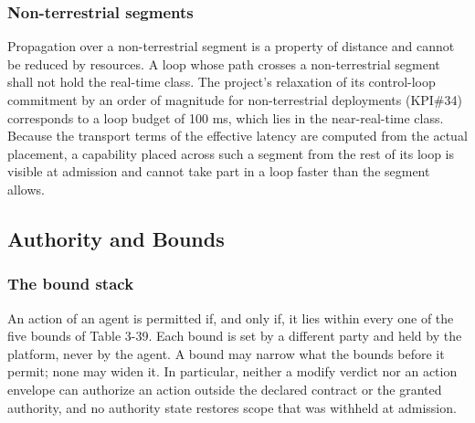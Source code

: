 \hypertarget{non-terrestrial-segments}{%
\subsubsection{Non-terrestrial segments}\label{non-terrestrial-segments}}

Propagation over a non-terrestrial segment is a property of distance and
cannot be reduced by resources. A loop whose path crosses a
non-terrestrial segment shall not hold the real-time class. The
project's relaxation of its control-loop commitment by an order of
magnitude for non-terrestrial deployments (KPI\#34) corresponds to a
loop budget of 100 ms, which lies in the near-real-time class. Because
the transport terms of the effective latency are computed from the
actual placement, a capability placed across such a segment from the
rest of its loop is visible at admission and cannot take part in a loop
faster than the segment allows.

\hypertarget{authority-and-bounds}{%
\subsection{Authority and Bounds}\label{authority-and-bounds}}

\hypertarget{the-bound-stack}{%
\subsubsection{The bound stack}\label{the-bound-stack}}

An action of an agent is permitted if, and only if, it lies within every
one of the five bounds of Table 3-39. Each bound is set by a different
party and held by the platform, never by the agent. A bound may narrow
what the bounds before it permit; none may widen it. In particular,
neither a modify verdict nor an action envelope can authorize an action
outside the declared contract or the granted authority, and no authority
state restores scope that was withheld at admission.

